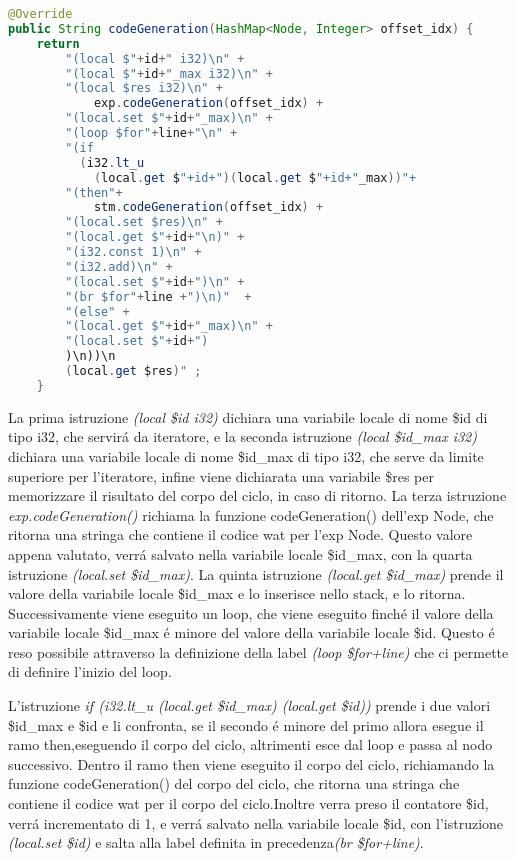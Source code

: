 \documentclass[../../main.tex]{subfiles}
\begin{document}
\begin{lstlisting}[language=Java, caption={codeGeneration() per il for Node}, label={lst:codeGenerationFor}]
@Override
public String codeGeneration(HashMap<Node, Integer> offset_idx) {
    return  
        "(local $"+id+" i32)\n" +
        "(local $"+id+"_max i32)\n" +
        "(local $res i32)\n" +
            exp.codeGeneration(offset_idx) +
        "(local.set $"+id+"_max)\n" +   
        "(loop $for"+line+"\n" +       
        "(if 
          (i32.lt_u 
            (local.get $"+id+")(local.get $"+id+"_max))"+
        "(then"+
            stm.codeGeneration(offset_idx) +
        "(local.set $res)\n" +
        "(local.get $"+id+"\n)" +     
        "(i32.const 1)\n" +
        "(i32.add)\n" +    
        "(local.set $"+id+")\n" +
        "(br $for"+line +")\n)"  +
        "(else" +
        "(local.get $"+id+"_max)\n" + 
        "(local.set $"+id+")
        )\n))\n
        (local.get $res)" ;   
    }

\end{lstlisting}

La prima istruzione \textit{(local \$id i32)} dichiara una variabile locale di nome \$id di tipo i32, che servirá da iteratore, e la seconda istruzione \textit{(local \$id\_max i32)} dichiara una variabile locale di nome \$id\_max di tipo i32, che serve da limite superiore per l'iteratore, infine viene dichiarata una variabile \$res per memorizzare il risultato del corpo del ciclo, in caso di ritorno.
La terza istruzione \textit{exp.codeGeneration()} richiama la funzione codeGeneration() dell'exp Node, che ritorna una stringa che contiene il codice wat per l'exp Node.
Questo valore appena valutato, verrá salvato nella variabile locale \$id\_max, con la quarta istruzione \textit{(local.set \$id\_max)}.
La quinta istruzione \textit{(local.get \$id\_max)} prende il valore della variabile locale \$id\_max e lo inserisce nello stack, e lo ritorna.
Successivamente viene eseguito un loop, che viene eseguito finché il valore della variabile locale \$id\_max é minore del valore della variabile locale \$id.
Questo é reso possibile attraverso la definizione della label \textit{(loop \$for+line)} che ci permette di definire l'inizio del loop.

L'istruzione \textit{if (i32.lt\_u (local.get \$id\_max) (local.get \$id))} prende i due valori \$id\_max e \$id e li confronta, se il secondo é minore del primo allora esegue il ramo then,eseguendo il corpo del ciclo, altrimenti esce dal loop e passa al nodo successivo.
Dentro il ramo then viene eseguito il corpo del ciclo, richiamando la funzione codeGeneration() del corpo del ciclo, che ritorna una stringa che contiene il codice wat per il corpo del ciclo.Inoltre verra preso il contatore \$id, verrá incrementato di 1, e verrá salvato nella variabile locale \$id, con l'istruzione \textit{(local.set \$id)} e salta alla label definita in precedenza\textit{(br \$for+line)}.
\end{document}
